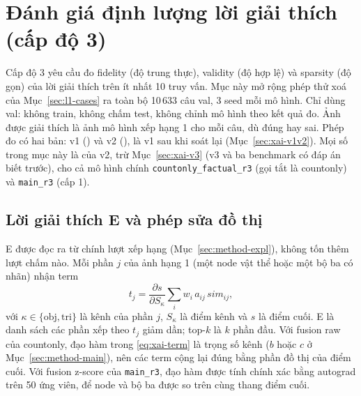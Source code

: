 \section{Đánh giá định lượng lời giải thích (cấp độ 3)}\label{sec:xai}

Cấp độ 3 yêu cầu đo fidelity (độ trung thực), validity (độ hợp lệ) và sparsity (độ gọn) của lời giải thích trên ít nhất 10 truy vấn.
Mục này mở rộng phép thử xoá của Mục~\ref{sec:l1-cases} ra toàn bộ 10\,633 câu val, 3 seed mỗi mô hình.
Chỉ dùng val: không train, không chấm test, không chỉnh mô hình theo kết quả đo.
Ảnh được giải thích là ảnh mô hình xếp hạng 1 cho mỗi câu, dù đúng hay sai.
Phép đo có hai bản: v1 () và v2 (), là v1 sau khi soát lại (Mục~\ref{sec:xai-v1v2}).
Mọi số trong mục này là của v2, trừ Mục~\ref{sec:xai-v3} (v3 và ba benchmark có đáp án biết trước), cho cả mô hình chính \texttt{countonly\_factual\_r3} (gọi tắt là countonly) và \texttt{main\_r3} (cấp 1).

\subsection{Lời giải thích E và phép sửa đồ thị}\label{sec:xai-setup}

E được đọc ra từ chính lượt xếp hạng (Mục~\ref{sec:method-expl}), không tốn thêm lượt chấm nào.
Mỗi phần $j$ của ảnh hạng 1 (một node vật thể hoặc một bộ ba có nhãn) nhận term
\begin{equation}
  t_j=\frac{\partial s}{\partial S_{\kappa}}\sum_i w_i\,a_{ij}\,\mathit{sim}_{ij},
  \label{eq:xai-term}
\end{equation}
với $\kappa\in\{\text{obj},\text{tri}\}$ là kênh của phần $j$, $S_\kappa$ là điểm kênh và $s$ là điểm cuối.
E là danh sách các phần xếp theo $t_j$ giảm dần; top-$k$ là $k$ phần đầu.
Với fusion raw của countonly, đạo hàm trong \eqref{eq:xai-term} là trọng số kênh ($b$ hoặc $c$ ở Mục~\ref{sec:method-main}), nên các term cộng lại đúng bằng phần đồ thị của điểm cuối.
Với fusion z-score của \texttt{main\_r3}, đạo hàm được tính chính xác bằng autograd trên 50 ứng viên, để node và bộ ba được so trên cùng thang điểm cuối.


